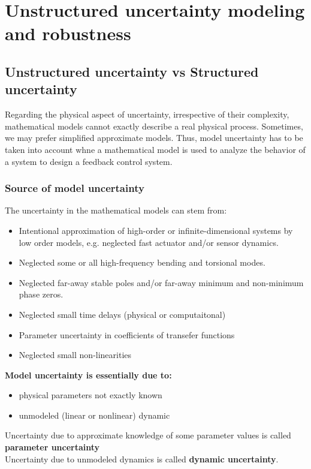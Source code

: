 \chapter{Unstructured uncertainty modeling and robustness}

\section{Unstructured uncertainty vs Structured uncertainty}
Regarding the physical aspect of uncertainty, irrespective of their complexity, mathematical models cannot exactly describe a real physical process. Sometimes, we may prefer simplified approximate models. Thus, model uncertainty has to be taken into account whne a mathematical model is used to analyze the behavior of a system to design a feedback control system.
\subsection{Source of model uncertainty}
The uncertainty in the mathematical models can stem from:
\begin{itemize}
    \item Intentional approximation of high-order or infinite-dimensional systems by low order models, e.g. neglected fast actuator and/or sensor dynamics.
    \item Neglected some or all high-frequency bending and torsional modes.
    \item Neglected far-away stable poles and/or far-away minimum and non-minimum phase zeros.
    \item Neglected small time delays (physical or computaitonal)
    \item Parameter uncertainty in coefficients of transefer functions 
    \item Neglected small non-linearities
\end{itemize}

\textbf{Model uncertainty is essentially due to:}
\begin{itemize}
    \item physical parameters not exactly known
    \item unmodeled (linear or nonlinear) dynamic
\end{itemize}

Uncertainty due to approximate knowledge of some parameter values is called \textbf{parameter uncertainty}\\
Uncertainty due to unmodeled dynamics is called \textbf{dynamic uncertainty}.\\

